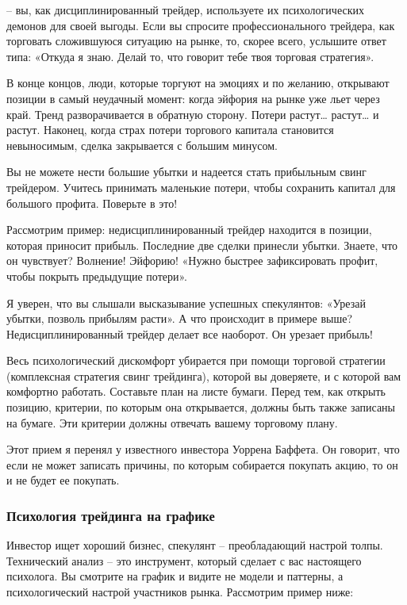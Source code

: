 \documentclass{book}
\begin{document}
– вы, как дисциплинированный трейдер, используете их психологических демонов для своей выгоды. Если вы спросите профессионального трейдера, как торговать сложившуюся ситуацию на рынке, то, скорее всего, услышите ответ типа: «Откуда я знаю. Делай то, что говорит тебе твоя торговая стратегия».

В конце концов, люди, которые торгуют на эмоциях и по желанию, открывают позиции в самый неудачный момент: когда эйфория на рынке уже льет через край. Тренд разворачивается в обратную сторону. Потери растут… растут… и растут. Наконец, когда страх потери торгового капитала становится невыносимым, сделка закрывается с большим минусом.

Вы не можете нести большие убытки и надеется стать прибыльным свинг трейдером. Учитесь принимать маленькие потери, чтобы сохранить капитал для большого профита. Поверьте в это!

Рассмотрим пример: недисциплинированный трейдер находится в позиции, которая приносит прибыль. Последние две сделки принесли убытки. Знаете, что он чувствует? Волнение! Эйфорию! «Нужно быстрее зафиксировать профит, чтобы покрыть предыдущие потери».

Я уверен, что вы слышали высказывание успешных спекулянтов: «Урезай убытки, позволь прибылям расти». А что происходит в примере выше? Недисциплинированный трейдер делает все наоборот. Он урезает прибыль!

Весь психологический дискомфорт убирается при помощи торговой стратегии (комплексная стратегия свинг трейдинга), которой вы доверяете, и с которой вам комфортно работать. Составьте план на листе бумаги. Перед тем, как открыть позицию, критерии, по которым она открывается, должны быть также записаны на бумаге. Эти критерии должны отвечать вашему торговому плану.

Этот прием я перенял у известного инвестора Уоррена Баффета. Он
говорит, что если не может записать причины, по которым собирается
покупать акцию, то он и не будет ее покупать.

\subsubsection{Психология трейдинга на графике}

Инвестор ищет хороший бизнес, спекулянт – преобладающий настрой толпы. Технический анализ – это инструмент, который сделает с вас настоящего психолога. Вы смотрите на график и видите не модели и паттерны, а психологический настрой участников рынка. Рассмотрим пример ниже:
\end{document}
